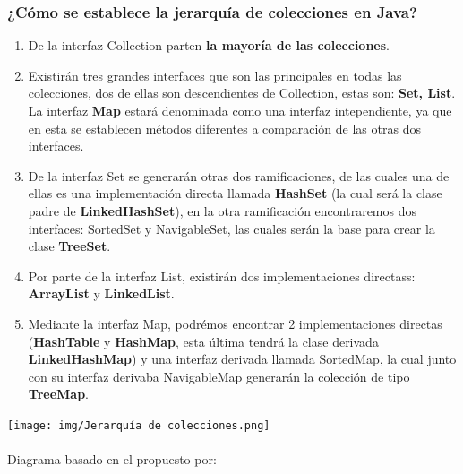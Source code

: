 \documentclass[12pt]{report}
\begin{document}
\subsubsection{¿Cómo se establece la jerarquía de colecciones en Java?}
\begin{enumerate}
    \item De la interfaz Collection parten \textbf{la mayoría de las colecciones}.
    \item Existirán tres grandes interfaces que son las principales en todas las colecciones, dos de ellas son descendientes de Collection, estas son: \textbf{Set, List}. La interfaz \textbf{Map} estará denominada como una interfaz intependiente, ya que en esta se establecen métodos diferentes a comparación de las otras dos interfaces.
    
    \item De la interfaz Set se generarán otras dos ramificaciones, de las cuales una de ellas es una implementación directa llamada \textbf{HashSet} (la cual será la clase padre de \textbf{LinkedHashSet}), en la otra ramificación encontraremos dos interfaces: SortedSet y NavigableSet, las cuales serán la base para crear la clase \textbf{TreeSet}.
    
    \item Por parte de la interfaz List, existirán dos implementaciones directass: \textbf{ArrayList} y \textbf{LinkedList}.
    
    \item Mediante la interfaz Map, podrémos encontrar 2 implementaciones directas (\textbf{HashTable} y \textbf{HashMap}, esta última tendrá la clase derivada \textbf{LinkedHashMap}) y una interfaz derivada llamada SortedMap, la cual junto con su interfaz derivaba NavigableMap generarán la colección de tipo \textbf{TreeMap}.
\end{enumerate}
\begin{center}
    \texttt{[image: img/Jerarquía de colecciones.png]}\\ \ \\Diagrama basado en el propuesto por: \cite{Colecciones}
\end{center}



\end{document}
